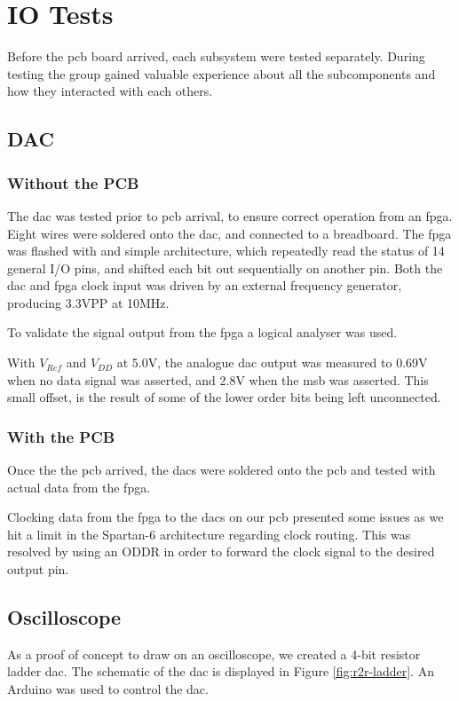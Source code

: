 \section{IO Tests}
Before the \gls{pcb} board arrived, each subsystem were tested separately.
During testing the group gained valuable experience about all the subcomponents and how they interacted with each others.

\subsection{DAC}

\subsubsection{Without the PCB}

The \gls{dac} was tested prior to \gls{pcb} arrival, to ensure correct operation from an \gls{fpga}.
Eight wires were soldered onto the \gls{dac}, and connected to a breadboard.
The \gls{fpga} was flashed with and simple architecture, which repeatedly read the status of 14 general I/O pins, and shifted each bit out sequentially on another pin.
Both the \gls{dac} and \gls{fpga} clock input was driven by an external frequency generator, producing 3.3VPP at 10MHz.

To validate the signal output from the \gls{fpga} a logical analyser was used.

With \(V_{Ref}\) and \(V_{DD}\) at 5.0V, the analogue \gls{dac} output was measured to 0.69V when no data signal was asserted, and 2.8V when the \gls{msb} was asserted. This small offset, is the result of some of the lower order bits being left unconnected.

\subsubsection{With the PCB}

Once the the \gls{pcb} arrived, the \gls{dac}s were soldered onto the \gls{pcb} and tested with actual data from the \gls{fpga}.

Clocking data from the \gls{fpga} to the \gls{dac}s on our \gls{pcb} presented some issues as we hit a limit in the Spartan-6 architecture regarding clock routing. This was resolved by using an ODDR\cite[pp. 61--65]{fpga-io} in order to forward the clock signal to the desired output pin.


\subsection{Oscilloscope}
As a proof of concept to draw on an oscilloscope, we created a 4-bit resistor ladder \gls{dac}. The schematic of the \gls{dac} is displayed in Figure \ref{fig:r2r-ladder}.
An Arduino was used to control the \gls{dac}.

